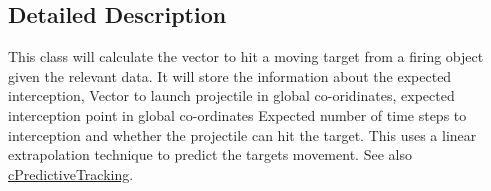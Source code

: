 \subsection{Detailed Description}
This class will calculate the vector to hit a moving target from a firing object given the relevant data. It will store the information about the expected interception, Vector to launch projectile in global co-\/oridinates, expected interception point in global co-\/ordinates Expected number of time steps to interception and whether the projectile can hit the target. This uses a linear extrapolation technique to predict the targets movement. See also \hyperlink{classc_predictive_tracking}{cPredictiveTracking}. 